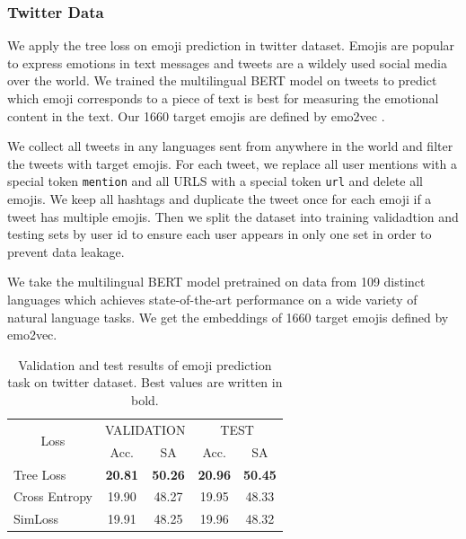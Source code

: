 \documentclass[twoside]{article}
\theoremstyle{definition}
\begin{document}
\subsubsection{Twitter Data}

We apply the tree loss on emoji prediction in twitter dataset. 
Emojis are popular to express emotions in text messages and tweets are a wildely used social media over the world. 
We trained the multilingual BERT model on tweets to predict which emoji corresponds to a piece of text is best for measuring the emotional content in the text. 
Our 1660 target emojis are defined by emo2vec \cite{Eisner2016emoji2vecLE}.

We collect all tweets \cite{Izbicki2019GeolocatingTI} in any languages sent from anywhere in the world and filter the tweets with target emojis. 
For each tweet, we replace all user mentions with a special token \texttt{\text{<}mention\text{>}} and all URLS with a special token \texttt{\text{<}url\text{>}} and delete all emojis. 
We keep all hashtags and duplicate the tweet once for each emoji if a tweet has multiple emojis. 
Then we split the dataset into training validadtion and testing sets by user id to ensure each user appears in only one set in order to prevent data leakage.

We take the multilingual BERT model \cite{Feng2020LanguageagnosticBS} pretrained on data from 109 distinct languages which achieves state-of-the-art performance on a wide variety of natural language tasks. 
We get the embeddings of 1660 target emojis defined by emo2vec.

\begin{table}[h]
\small
\caption{Validation and test results of emoji prediction task on twitter dataset. Best values are written in bold.} \label{twitter}
\begin{center}
\begin{tabular}{@{}lcccc@{}}
\toprule
\multicolumn{1}{c}{\multirow{2}{*}{Loss}} & \multicolumn{2}{c}{VALIDATION} & \multicolumn{2}{c}{TEST}       \\ \cmidrule(l){2-5} 
\multicolumn{1}{c}{}                      & Acc.       & SA       & Acc.      & SA             \\ \cmidrule(r){1-1}
Tree Loss                           &   \textbf{20.81}    &   \textbf{50.26}  &  \textbf{20.96}    &   \textbf{50.45}        \\
Cross Entropy                             &   19.90    &   48.27  &  19.95    &   48.33        \\
SimLoss                                   &   19.91    &   48.25  &  19.96    &   48.32         \\ \bottomrule
\end{tabular}
\end{center}
\end{table}
\end{document}
